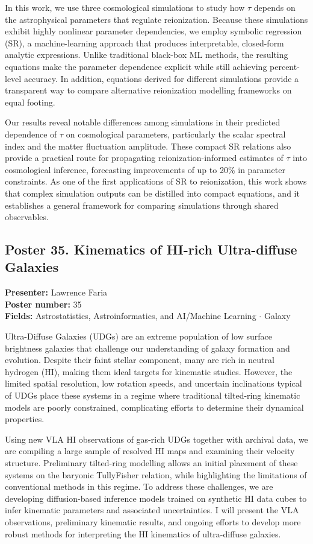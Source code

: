 In this work, we use three cosmological simulations to study how $\tau$ depends on the astrophysical parameters that regulate reionization. Because these simulations exhibit highly nonlinear parameter dependencies, we employ symbolic regression (SR), a machine-learning approach that produces interpretable, closed-form analytic expressions. Unlike traditional black-box ML methods, the resulting equations make the parameter dependence explicit while still achieving percent-level accuracy. In addition, equations derived for different simulations provide a transparent way to compare alternative reionization modelling frameworks on equal footing.

Our results reveal notable differences among simulations in their predicted dependence of $\tau$ on cosmological parameters, particularly the scalar spectral index and the matter fluctuation amplitude. These compact SR relations also provide a practical route for propagating reionization-informed estimates of $\tau$ into cosmological inference, forecasting improvements of up to 20\% in parameter constraints. As one of the first applications of SR to reionization, this work shows that complex simulation outputs can be distilled into compact equations, and it establishes a general framework for comparing simulations through shared observables.

\hypertarget{poster-abstract-talk-34}{}\label{poster-abstract-page-talk-34}
\subsection*{Poster 35. Kinematics of HI-rich Ultra-diffuse Galaxies}
\textbf{Presenter:} Lawrence Faria\\
\textbf{Poster number:} 35\\
\textbf{Fields:} Astrostatistics, Astroinformatics, and AI/Machine Learning $\cdot$ Galaxy

Ultra-Diffuse Galaxies (UDGs) are an extreme population of low surface brightness galaxies that challenge our understanding of galaxy formation and evolution. Despite their faint stellar component, many are rich in neutral hydrogen (HI), making them ideal targets for kinematic studies. However, the limited spatial resolution, low rotation speeds, and uncertain inclinations typical of UDGs place these systems in a regime where traditional tilted-ring kinematic models are poorly constrained, complicating efforts to determine their dynamical properties.

Using new VLA HI observations of gas-rich UDGs together with archival data, we are compiling a large sample of resolved HI maps and examining their velocity structure. Preliminary tilted-ring modelling allows an initial placement of these systems on the baryonic TullyFisher relation, while highlighting the limitations of conventional methods in this regime. To address these challenges, we are developing diffusion-based inference models trained on synthetic HI data cubes to infer kinematic parameters and associated uncertainties. I will present the VLA observations, preliminary kinematic results, and ongoing efforts to develop more robust methods for interpreting the HI kinematics of ultra-diffuse galaxies.

